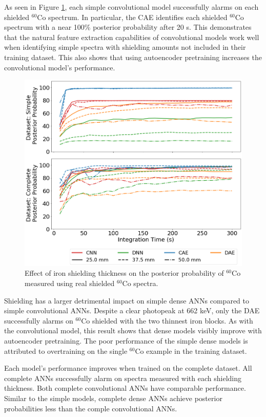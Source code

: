As seen in Figure \ref{fig:iron_co60}, each simple convolutional model successfully alarms on each shielded  $^{60}$Co spectrum. In particular, the CAE identifies each shielded $^{60}$Co spectrum with a near 100\% posterior probability after 20 s. This demonstrates that the natural feature extraction capabilities of convolutional models work well when identifying simple spectra with shielding amounts not included in their training dataset. This also shows that using autoencoder pretraining increases the convolutional model's performance.

\begin{figure}[H]
	\centering
	\includegraphics[width=0.8\linewidth]{images/iron_co60}	
	\caption{Effect of iron shielding thickness on the posterior probability of $^{60}$Co measured using real shielded $^{60}$Co spectra.}
	\label{fig:iron_co60}
\end{figure}

Shielding has a larger detrimental impact on simple dense ANNs compared to simple convolutional ANNs. Despite a clear photopeak at 662 keV, only the DAE successfully alarms on $^{60}$Co shielded with the two thinnest iron blocks. As with the convolutional model, this result shows that dense models visibly improve with autoencoder pretraining. The poor performance of the simple dense models is attributed to overtraining on the single $^{60}$Co example in the training dataset. 

Each model's performance improves when trained on the complete dataset. All complete ANNs successfully alarm on spectra measured with each shielding thickness. Both complete convolutional ANNs have comparable performance. Similar to the simple models, complete dense ANNs achieve posterior probabilities less than the comple convolutional ANNs.

